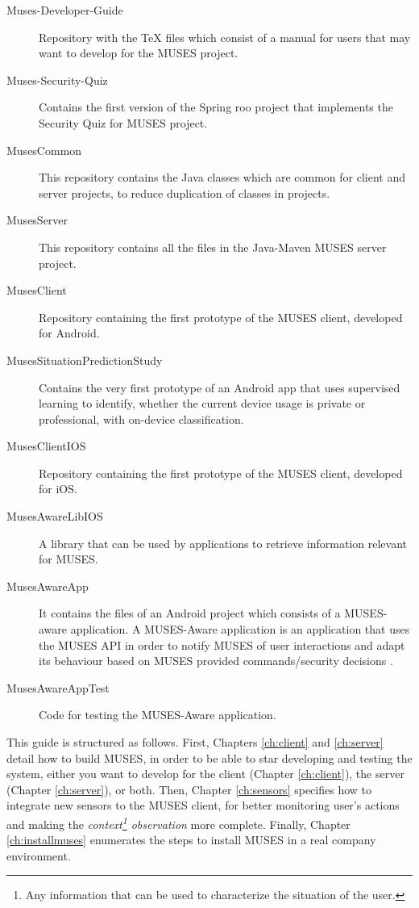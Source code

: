 \begin{description}
  \item[Muses-Developer-Guide] Repository with the TeX files which consist of a manual for users that may want to develop for the MUSES project.
  \item[Muses-Security-Quiz] Contains the first version of the Spring roo project that implements the Security Quiz for MUSES project.
  \item[MusesCommon] This repository contains the Java classes which are common for client and server projects, to reduce duplication of classes in projects.
  \item[MusesServer] This repository contains all the files in the Java-Maven MUSES server project.
  \item[MusesClient] Repository containing the first prototype of the MUSES client, developed for Android.
  \item[MusesSituationPredictionStudy] Contains the very first
    prototype of an Android app that uses supervised learning to
    identify, whether the current device usage is private or
    professional, with on-device classification. 
  \item[MusesClientIOS] Repository containing the first prototype of the MUSES client, developed for iOS.
  \item[MusesAwareLibIOS] A library that can be used by applications to retrieve information relevant for MUSES.
  \item[MusesAwareApp] It contains the files of an Android project which consists of a MUSES-aware application. A MUSES-Aware application is an application that uses the MUSES API in order to notify MUSES of user interactions and adapt its behaviour based on MUSES provided commands/security decisions \cite{deliverable24}.
  \item[MusesAwareAppTest] Code for testing the MUSES-Aware
    application. %
\end{description}

This guide is structured as follows. First, Chapters \ref{ch:client} and \ref{ch:server} detail how to build MUSES, in order to be able to star developing and testing the system, either you want to develop for the client (Chapter \ref{ch:client}), the server (Chapter \ref{ch:server}), or both. Then, Chapter \ref{ch:sensors} specifies how to integrate new sensors to the MUSES client, for better monitoring user's actions and making the \textit{context\footnote{Any information that can be used to characterize the situation of the user.\cite{deliverable61}} observation} more complete. Finally, Chapter \ref{ch:installmuses} enumerates the steps to install MUSES in a real company environment.

